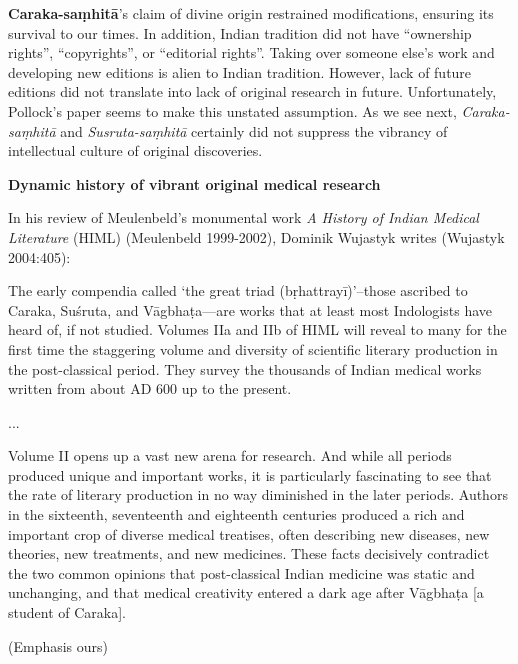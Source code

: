 {\bf Caraka-saṃhitā}'s claim of divine origin restrained modifications, ensuring its survival to our times. In addition, Indian tradition did not have ``ownership rights'', ``copyrights'', or ``editorial rights''.  Taking over someone else's work and developing new editions is alien to Indian tradition.  However, lack of future editions did not translate into lack of original research in future.  Unfortunately, Pollock's paper seems to make this unstated assumption. As we see next, {\sl Caraka-saṃhitā} and {\sl Susruta-saṃhitā} certainly did not suppress the vibrancy of intellectual culture of original discoveries.

{\bf Dynamic history of vibrant original medical research}

In his review of Meulenbeld's monumental work {\sl A History of Indian Medical Literature} (HIML) (Meulenbeld 1999-2002), Dominik Wujastyk writes (Wujastyk 2004:405):
\begin{myquote}
The early compendia called `the great triad (bṛhattrayī)'--those ascribed to Caraka, Suśruta, and Vāgbhaṭa---are works that at least most Indologists have heard of, if not studied. Volumes IIa and IIb of HIML will reveal to many for the first time the staggering volume and diversity of scientific literary production in the post-classical period. They survey the thousands of Indian medical works written from about AD 600 up to the present. 

...

Volume II opens up a vast new arena for research. And while all periods produced unique and important works, it is particularly fascinating to see that the rate of literary production in no way diminished in the later periods.  Authors in the sixteenth, seventeenth and eighteenth centuries produced a rich and important crop of diverse medical treatises, often describing new diseases, new theories, new treatments, and new medicines. These facts decisively contradict the two common opinions that post-classical Indian medicine was static and unchanging, and that medical creativity entered a dark age after Vāgbhaṭa [a student of Caraka].

(Emphasis ours)
\end{myquote}

